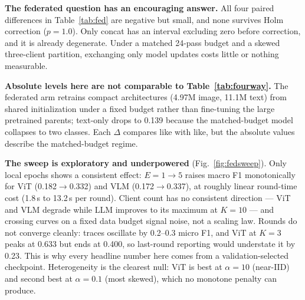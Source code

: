 \documentclass[conference]{IEEEtran}
\begin{document}
\textbf{The federated question has an encouraging answer.} All four paired
differences in Table~\ref{tab:fed} are negative but small, and none survives Holm
correction ($p{=}1.0$). Only concat has an interval excluding zero before
correction, and it is already degenerate. Under a matched 24-pass budget and a
skewed three-client partition, exchanging only model updates costs little or
nothing measurable.

\textbf{Absolute levels here are not comparable to Table~\ref{tab:fourway}.} The
federated arm retrains compact architectures (4.97M image, 11.1M text) from shared
initialization under a fixed budget rather than fine-tuning the large pretrained
parents; text-only drops to 0.139 because the matched-budget model collapses to
two classes. Each $\Delta$ compares like with like, but the absolute values
describe the matched-budget regime.

\textbf{The sweep is exploratory and underpowered}
(Fig.~\ref{fig:fedsweep}). Only
local epochs shows a consistent effect: $E{=}1\to5$ raises macro F1 monotonically
for ViT (0.182$\to$0.332) and VLM (0.172$\to$0.337), at roughly linear round-time
cost (1.8\,s to 13.2\,s per round). Client count has no consistent direction --- ViT and VLM degrade while LLM
improves to its maximum at $K{=}10$ --- and crossing curves on a fixed data budget
signal noise, not a scaling law. Rounds do not converge cleanly: traces oscillate
by 0.2--0.3 micro F1, and ViT at $K{=}3$ peaks at 0.633 but ends at 0.400, so
last-round reporting would understate it by 0.23. This is why every headline number
here comes from a validation-selected checkpoint. Heterogeneity is the clearest
null: ViT is best at $\alpha{=}10$ (near-IID) and second best at $\alpha{=}0.1$
(most skewed), which no monotone penalty can produce.
\end{document}
